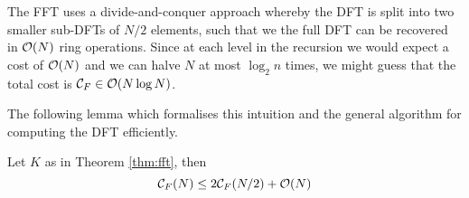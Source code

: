 The FFT uses a divide-and-conquer approach whereby the DFT is split into two smaller sub-DFTs of $N/2$ elements, such that we the full DFT can be recovered in $\mathcal O(N)$ ring operations. Since at each level in the recursion we would expect a cost of $\mathcal O(N)$ and we can halve $N$ at most $\log_2 n$ times, we might guess that the total cost is $\mathcal C_F \in \mathcal O(N \log N)$.

The following lemma which formalises this intuition and the general algorithm for computing the DFT efficiently. 

\begin{lemma}\label{lem:fft-recursion}
    Let $K$ as in Theorem \ref{thm:fft}, then 
    \begin{equation}\label{eq:fftlem}
        \mathcal C_F(N) \le 2 \mathcal C_F(N/2) + \mathcal O(N)
    \end{equation}
\end{lemma}


